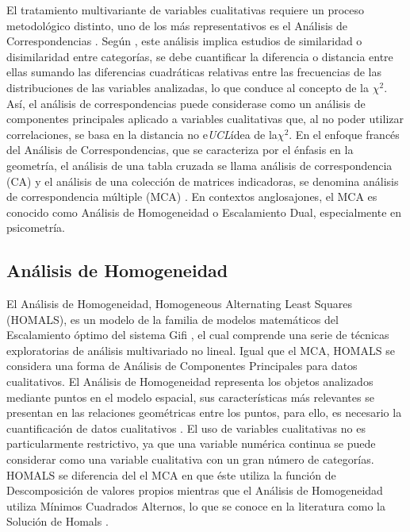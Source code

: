 \documentclass[water,article,submit,moreauthors,pdftex]{mdpi}
\begin{document}
El tratamiento multivariante de variables cualitativas requiere un
proceso metodológico distinto, uno de los más representativos es el
Análisis de Correspondencias \citep{Benzecri}. Según \citep{perez2004},
este análisis implica estudios de similaridad o disimilaridad entre
categorías, se debe cuantificar la diferencia o distancia entre ellas
sumando las diferencias cuadráticas relativas entre las frecuencias de
las distribuciones de las variables analizadas, lo que conduce al
concepto de la \(\chi^2\). Así, el análisis de correspondencias puede
considerase como un análisis de componentes principales aplicado a
variables cualitativas que, al no poder utilizar correlaciones, se basa
en la distancia no e\emph{UCL}ídea de la\(\chi^2\). En el enfoque
francés del Análisis de Correspondencias, que se caracteriza por el
énfasis en la geometría, el análisis de una tabla cruzada se llama
análisis de correspondencia (CA) y el análisis de una colección de
matrices indicadoras, se denomina análisis de correspondencia múltiple
(MCA) \citep{michailidis1998}. En contextos anglosajones, el MCA es
conocido como Análisis de Homogeneidad o Escalamiento Dual,
especialmente en psicometría.

\hypertarget{anuxe1lisis-de-homogeneidad}{%
\subsection{Análisis de
Homogeneidad}\label{anuxe1lisis-de-homogeneidad}}

El Análisis de Homogeneidad, Homogeneous Alternating Least Squares
(HOMALS), es un modelo de la familia de modelos matemáticos del
Escalamiento óptimo del sistema Gifi \citep{Gifi1990}, el cual comprende
una serie de técnicas exploratorias de análisis multivariado no lineal.
Igual que el MCA, HOMALS se considera una forma de Análisis de
Componentes Principales para datos cualitativos. El Análisis de
Homogeneidad representa los objetos analizados mediante puntos en el
modelo espacial, sus características más relevantes se presentan en las
relaciones geométricas entre los puntos, para ello, es necesario la
cuantificación de datos cualitativos \citep{Lopez2014}. El uso de
variables cualitativas no es particularmente restrictivo, ya que una
variable numérica continua se puede considerar como una variable
cualitativa con un gran número de categorías. HOMALS se diferencia del
el MCA en que éste utiliza la función de Descomposición de valores
propios mientras que el Análisis de Homogeneidad utiliza Mínimos
Cuadrados Alternos, lo que se conoce en la literatura como la Solución
de Homals \citep{michailidis1998}.
\end{document}
